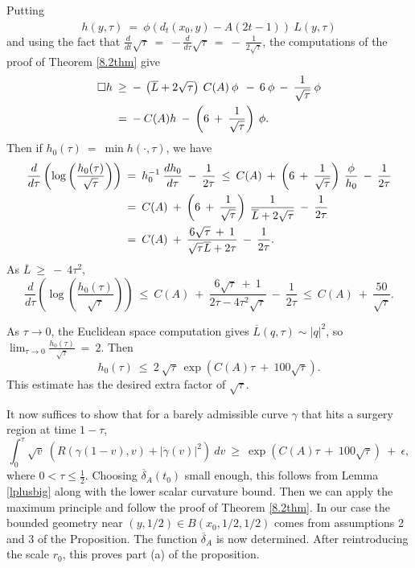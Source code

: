 Putting
\begin{equation}
h(y, \tau) \: = \: \phi(d_t(x_0, y) - A (2t-1)) \: \hat{L}(y, \tau)
\end{equation}
and using the fact that $\frac{d}{dt} \sqrt{\tau} \: = \:
- \frac{d}{d\tau} \sqrt{\tau} \: = \: - \: \frac{1}{2 \sqrt{\tau}}$,
the computations of the proof of Theorem \ref{8.2thm} give
\begin{align}
\square h \: & \ge \: - \: \left( \overline{L} + 2 \sqrt{\tau} \right)
\: C(A) \: \phi \:
\: - \: 6 \: \phi \: - \: \frac{1}{\sqrt{\tau}} \: \phi \\
& = \: - \: C(A) h \: - \: \left( 6 \: + \: \frac{1}{\sqrt{\tau}}
\right) \: \phi.
\notag
\end{align}
Then if  $h_0(\tau) \: = \: \min h(\cdot, \tau)$, we have
\begin{align}
\frac{d}{d\tau} \left( \log \left( \frac{h_0(\tau)}{\sqrt{\tau}} \right)
\right) \: & = \: h_0^{-1} \: \frac{dh_0}{d\tau} \: - \: \frac{1}{2\tau}
\: \le \: C(A) \: + \: \left( 6 \: + \: \frac{1}{\sqrt{\tau}} \right)
\: \frac{\phi}{h_0} \: - \: \frac{1}{2\tau} \\
& = \: C(A) \: + \: \left( 6 \: + \: \frac{1}{\sqrt{\tau}} \right)
\: \frac{1}{\overline{L} + 2 \sqrt{\tau}} \: - \: \frac{1}{2\tau} \notag \\
& = \: C(A) \: + \:
\frac{6 \sqrt{\tau} \: + \: 1}{\sqrt{\tau} \overline{L} + 2 {\tau}} \:
- \: \frac{1}{2\tau}. \notag
\end{align}
As $\overline{L} \: \ge \: - \: 4 \tau^2$,
\begin{equation}
\frac{d}{d\tau} \left( \log \left( \frac{h_0(\tau)}{\sqrt{\tau}} \right)
\right) \:  \le \:
C(A) \: + \:
\frac{6 \sqrt{\tau} \: + \: 1}{2 {\tau} - 4 \tau^2 \sqrt{\tau}} \:
- \: \frac{1}{2\tau} \: \le \: C(A) \: + \: \frac{50}{\sqrt{\tau}}.
\end{equation}

As $\tau \rightarrow 0$, the Euclidean space computation gives
$\overline{L}(q, \tau) \sim |q|^2$, so
$\lim_{\tau \rightarrow 0} \frac{h_0(\tau)}{\sqrt{\tau}} \: = \: 2$.
Then
\begin{equation}
{h_0(\tau)} \: \le \:
2 \: \sqrt{\tau} \: \exp(C(A) \tau \: + \: 100 \sqrt{\tau}).
\end{equation}
This estimate has the desired extra factor of $\sqrt{\tau}$.

It now suffices to show that for a barely admissible curve $\gamma$
that hits a surgery region at time $1-\tau$,
\begin{equation}
\int_0^\tau \sqrt{v} \: \left( R(\gamma(1-v), v) +
|\dot{\gamma}(v)|^2
\right) \: dv \: \ge \:
\exp(C(A) \tau \: + \: 100 \sqrt{\tau}) \: + \:
\epsilon,
\end{equation}
where $0 < \tau \le \frac12$. Choosing $\overline{\delta}_A(t_0)$ small
enough, this follows from Lemma \ref{lplusbig}
along with the lower scalar curvature bound.
Then we can apply the maximum principle and follow the proof of
Theorem \ref{8.2thm}. In our case the bounded geometry near $(y, 1/2) \in
B(x_0, 1/2, 1/2)$ comes from assumptions 2 and 3 of the
Proposition. The function $\overline{\delta}_A$ is now determined.
After reintroducing the scale $r_0$,
this proves part (a) of the proposition.

